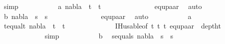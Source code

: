 \begin{isabellebody}
\ simp\isanewline
\ \ \ \ \ \ \ \ \ \isamarkupfalse%
\ a{\isacharcolon}{\kern0pt}\ {\isachardoublequoteopen}nabla\ {\isasymturnstile}\ t{}{\isacharprime}{\kern0pt}\ {\isasymapprox}\ t{}{\isacharprime}{\kern0pt}{\isachardoublequoteclose}\ \isanewline
\ \ \ \ \ \ \ \ \ \ \ \isamarkupfalse%
\ {\isachardoublequoteopen}{}{\isachardoublequoteclose}{\isacharparenleft}{\kern0pt}{}{\isacharcomma}{\kern0pt}{}{\isacharparenright}{\kern0pt}\ equ{\isacharunderscore}{\kern0pt}paar\ \isamarkupfalse%
\ auto\isanewline
\ \ \ \ \ \ \ \ \ \isamarkupfalse%
\ b{\isacharcolon}{\kern0pt}\ {\isachardoublequoteopen}nabla\ {\isasymturnstile}\ s{}{\isacharprime}{\kern0pt}\ {\isasymapprox}\ s{}{\isacharprime}{\kern0pt}{\isachardoublequoteclose}\ \isanewline
\ \ \ \ \ \ \ \ \ \ \ \isamarkupfalse%
\ {\isachardoublequoteopen}{}{\isachardoublequoteclose}\ equ{\isacharunderscore}{\kern0pt}paar\ \isamarkupfalse%
\ auto\isanewline
\ \ \ \ \ \ \ \ \ \isamarkupfalse%
\ a\ \isamarkupfalse%
\ t{}{\isacharunderscore}{\kern0pt}equal{\isacharunderscore}{\kern0pt}t{}{\isacharcolon}{\kern0pt}\ {\isachardoublequoteopen}nabla\ {\isasymturnstile}\ t{}{\isacharprime}{\kern0pt}\ {\isasymapprox}\ t{}{\isacharprime}{\kern0pt}{\isachardoublequoteclose}\ \isanewline
\ \ \ \ \ \ \ \ \ \ \ \isamarkupfalse%
\ IH{\isacharunderscore}{\kern0pt}usable{\isacharbrackleft}{\kern0pt}of\ t{}{\isacharprime}{\kern0pt}\ t{}{\isacharprime}{\kern0pt}\ t{}{\isacharprime}{\kern0pt}{\isacharbrackright}{\kern0pt}\ equ{\isacharunderscore}{\kern0pt}paar{\isacharparenleft}{\kern0pt}{}{\isacharparenright}{\kern0pt}\ {}{\isacharparenleft}{\kern0pt}{}{\isacharparenright}{\kern0pt}\ deptht{}\isanewline
\ \ \ \ \ \ \ \ \ \ \ \isamarkupfalse%
\ simp\isanewline
\ \ \ \ \ \ \ \ \ \isamarkupfalse%
\ b\ \isamarkupfalse%
\ s{}{\isacharunderscore}{\kern0pt}equal{\isacharunderscore}{\kern0pt}s{}{\isacharcolon}{\kern0pt}\ {\isachardoublequoteopen}nabla\ {\isasymturnstile}\ s{}{\isacharprime}{\kern0pt}\ {\isasymapprox}\ s{}{\isacharprime}{\kern0pt}{\isachardoublequoteclose}\ \isanewline
\ \ \ \ \ \ \ \ \ \ \ \isamarkupfalse%

\end{isabellebody}
